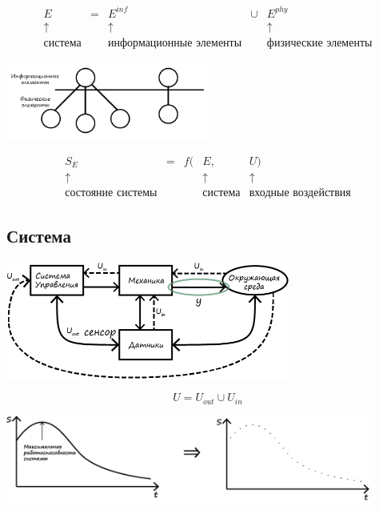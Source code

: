 \documentclass[12pt]{article}
\begin{document}
\begin{sloppypar}
    \[
        \begin{array}{ccccc}
            E              & = & E^{\textit{inf}}               & \cup & E^{phy}                    \\
            \uparrow       &   & \uparrow                       &      & \uparrow                   \\
            \text{система} &   & \text{информационные элементы} &      & \text{физические элементы}
        \end{array}
    \]
    \begin{center}
        \includegraphics[width=0.5\textwidth]{graphics/Информационные_и_физические_элементы.png}
    \end{center}
    \[
        \begin{array}{ccccc}
            S_E                      & = & f( & E,             & U)                         \\
            \uparrow                 &   &    & \uparrow       & \uparrow                   \\
            \text{состояние системы} &   &    & \text{система} & \text{входные воздействия}
        \end{array}
    \]

    \subsection*{Система}

    \begin{center}
        \includegraphics[width=0.7\textwidth]{graphics/Система.png}
    \end{center}

    \[
        U = U_{out} \cup U_{in}
    \]

    \includegraphics[width=0.9\textwidth]{graphics/Состояние системы.png}


\end{sloppypar}
\end{document}
